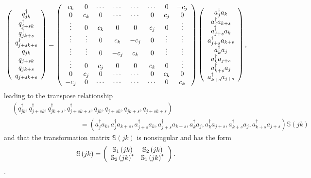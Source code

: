 \documentclass[aps,preprint]{revtex4}%
\begin{document}
\begin{equation}
\left(
\begin{array}
[c]{c}%
q_{jk}^{\dagger}\\
q_{j+sk}^{\dagger}\\
q_{jk+s}^{\dagger}\\
q_{j+sk+s}^{\dagger}\\
q_{jk}\\
q_{j+sk}\\
q_{jk+s}\\
q_{j+sk+s}%
\end{array}
\right)  =\left(
\begin{array}
[c]{cccccccc}%
c_{k} & 0 & \cdots & \cdots & \cdots & \cdots & 0 & -c_{j}\\
0 & c_{k} & 0 & \cdots & \cdots & 0 & c_{j} & 0\\
\vdots & 0 & c_{k} & 0 & 0 & c_{j} & 0 & \vdots\\
\vdots & \vdots & 0 & c_{k} & -c_{j} & 0 & \vdots & \vdots\\
\vdots & \vdots & 0 & -c_{j} & c_{k} & 0 & \vdots & \vdots\\
\vdots & 0 & c_{j} & 0 & 0 & c_{k} & 0 & \vdots\\
0 & c_{j} & 0 & \cdots & \cdots & 0 & c_{k} & 0\\
-c_{j} & 0 & \cdots & \cdots & \cdots & \cdots & 0 & c_{k}%
\end{array}
\right)  \left(
\begin{array}
[c]{c}%
a_{j}^{\dagger}a_{k}\\
a_{j}^{\dagger}a_{k+s}\\
a_{j+s}^{\dagger}a_{k}\\
a_{j+s}^{\dagger}a_{k+s}\\
a_{k}^{\dagger}a_{j}\\
a_{k}^{\dagger}a_{j+s}\\
a_{k+s}^{\dagger}a_{j}\\
a_{k+s}^{\dagger}a_{j+s}%
\end{array}
\right)  ,
\end{equation}
leading to the transpose relationship
\begin{align}
&  \left(  q_{jk}^{\dagger},q_{j+sk}^{\dagger},q_{jk+s}^{\dagger}%
,q_{j+sk+s}^{\dagger},q_{jk},q_{j+sk},q_{jk+s},q_{j+sk+s}\right) \nonumber\\
&  \qquad\qquad\qquad\qquad\qquad\left.  =\right.  \left(  a_{j}^{\dagger
}a_{k},a_{j}^{\dagger}a_{k+s},a_{j+s}^{\dagger}a_{k},a_{j+s}^{\dagger}%
a_{k+s},a_{k}^{\dagger}a_{j},a_{k}^{\dagger}a_{j+s},a_{k+s}^{\dagger}%
a_{j},a_{k+s}^{\dagger}a_{j+s}\right)  \mathbb{S}\left(  jk\right)
\end{align}
and that the transformation matrix $\mathbb{S}\left(  jk\right)  $ is
nonsingular and has the form
\begin{equation}
\mathbb{S}\left(  jk\right)  =\left(
\begin{array}
[c]{cc}%
\mathbb{S}_{1}\left(  jk\right)  & \mathbb{S}_{2}\left(  jk\right) \\
\mathbb{S}_{2}\left(  jk\right)  ^{\ast} & \mathbb{S}_{1}\left(  jk\right)
^{\ast}%
\end{array}
\right)  .
\end{equation}
.
\end{document}
